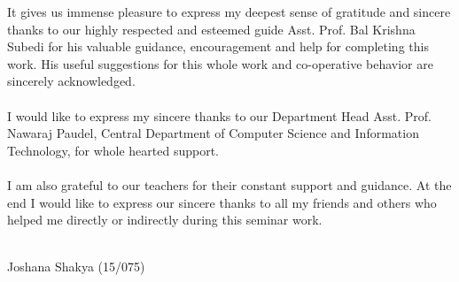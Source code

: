 It gives us immense pleasure to express my deepest sense of gratitude and sincere thanks to our highly respected and esteemed guide Asst. Prof. Bal Krishna Subedi for his valuable guidance, encouragement and help for completing this work. His useful suggestions for this whole work and co-operative behavior are sincerely acknowledged.
\\\\
I would like to express my sincere thanks to our Department Head Asst. Prof. Nawaraj Paudel, Central Department of Computer Science and Information Technology, for whole hearted support.
\\\\
I am also grateful to our teachers for their constant support and guidance. At the end I would like to express our sincere thanks to all my friends and others who helped me directly or indirectly during this seminar work.
\\\\
\begin{flushright}
Joshana Shakya (15/075)
\end{flushright}
